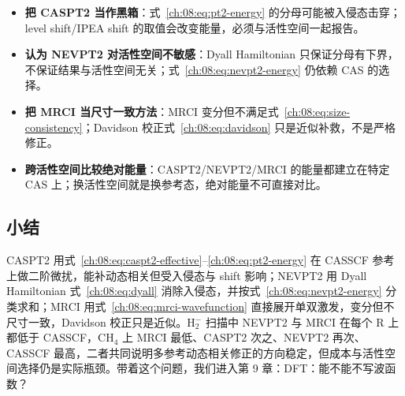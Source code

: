 \begin{pitfall}
\begin{itemize}
  \item \textbf{把 CASPT2 当作黑箱}：式~\eqref{ch:08:eq:pt2-energy} 的分母可能被入侵态击穿；level shift/IPEA shift 的取值会改变能量，必须与活性空间一起报告。
  \item \textbf{认为 NEVPT2 对活性空间不敏感}：Dyall Hamiltonian 只保证分母有下界，不保证结果与活性空间无关；式~\eqref{ch:08:eq:nevpt2-energy} 仍依赖 CAS 的选择。
  \item \textbf{把 MRCI 当尺寸一致方法}：MRCI 变分但不满足式~\eqref{ch:08:eq:size-consistency}；Davidson 校正式~\eqref{ch:08:eq:davidson} 只是近似补救，不是严格修正。
  \item \textbf{跨活性空间比较绝对能量}：CASPT2/NEVPT2/MRCI 的能量都建立在特定 CAS 上；换活性空间就是换参考态，绝对能量不可直接对比。
\end{itemize}
\end{pitfall}

\subsection*{小结}
CASPT2 用式~\eqref{ch:08:eq:caspt2-effective}--\eqref{ch:08:eq:pt2-energy} 在 CASSCF 参考上做二阶微扰，能补动态相关但受入侵态与 shift 影响；NEVPT2 用 Dyall Hamiltonian 式~\eqref{ch:08:eq:dyall} 消除入侵态，并按式~\eqref{ch:08:eq:nevpt2-energy} 分类求和；MRCI 用式~\eqref{ch:08:eq:mrci-wavefunction} 直接展开单双激发，变分但不尺寸一致，Davidson 校正只是近似。H$_2^-$ 扫描中 NEVPT2 与 MRCI 在每个 R 上都低于 CASSCF，CH$_4$ 上 MRCI 最低、CASPT2 次之、NEVPT2 再次、CASSCF 最高，二者共同说明多参考动态相关修正的方向稳定，但成本与活性空间选择仍是实际瓶颈。带着这个问题，我们进入第 9 章：DFT：能不能不写波函数？
